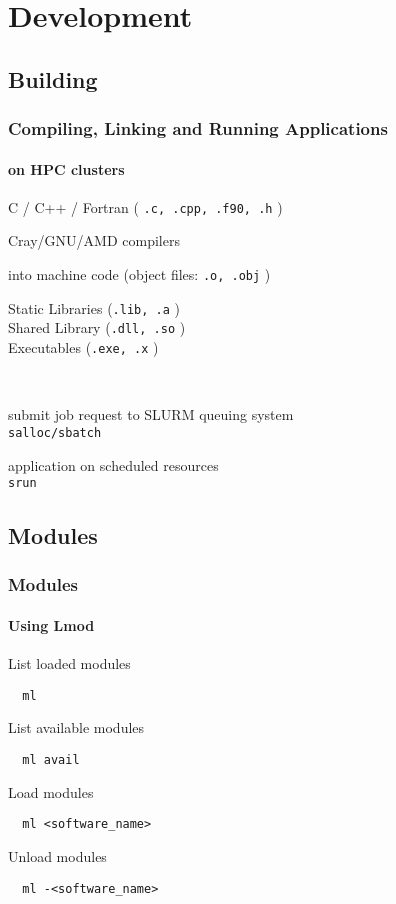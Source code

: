 \section{Development}
\subsection{Building}
\begin{frame}[fragile]
\frametitle{Compiling, Linking and Running Applications}
\framesubtitle{on HPC clusters}
 \begin{description}
    \item [source code] C / C++ / Fortran ( \verb|.c, .cpp, .f90, .h|  )
    \item [compile] Cray/GNU/AMD compilers
    \item [assemble] into machine code (object files: \verb|.o, .obj| )
    \item [link] Static Libraries (\verb|.lib, .a|  ) \\ Shared Library (\verb|.dll, .so| ) \\ Executables (\verb|.exe, .x| )
    \item ~ 
    \item [request allocation] submit job request to SLURM queuing system \\ \verb|salloc/sbatch|
    \item [run] application on scheduled resources \\ \verb|srun|
 \end{description}
\end{frame}

\subsection{Modules}
\begin{frame}[fragile]
\frametitle{Modules}
\framesubtitle{Using Lmod}

\begin{exampleblock}{List loaded modules}
  \begin{verbatim}
  ml
  \end{verbatim}
\end{exampleblock}

\begin{exampleblock}{List available modules}
  \begin{verbatim}
  ml avail
  \end{verbatim}
\end{exampleblock}

\begin{exampleblock}{Load modules}
  \begin{verbatim}
  ml <software_name>
  \end{verbatim}
\end{exampleblock}

\begin{exampleblock}{Unload modules}
  \begin{verbatim}
  ml -<software_name>
  \end{verbatim}
\end{exampleblock}
\end{frame}


